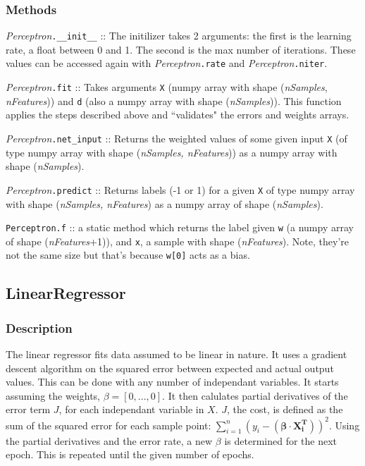\documentclass{article}
\begin{document}
\subsubsection{Methods}

\textit{Perceptron}\texttt{.\_\_init\_\_} :: The initilizer takes 2 arguments:
the first is the learning rate, a float between 0 and 1. The second is the max
number of iterations. These values can be accessed again with
\textit{Perceptron}\texttt{.rate} and \textit{Perceptron}\texttt{.niter}.

\textit{Perceptron}\texttt{.fit} :: Takes arguments \texttt{X} (numpy array with
shape (\textit{nSamples}, \textit{nFeatures})) and \texttt{d} (also a numpy
array with shape (\textit{nSamples})). This function applies the steps described
above and ``validates" the errors and weights arrays.

\textit{Perceptron}\texttt{.net\_input} :: Returns the weighted values of some
given input \texttt{X} (of type numpy array with shape (\textit{nSamples,
nFeatures})) as a numpy array with shape (\textit{nSamples}).

\textit{Perceptron}\texttt{.predict} :: Returns labels (-1 or 1) for a given
\texttt{X} of type numpy array with shape (\textit{nSamples, nFeatures}) as a
numpy array of shape (\textit{nSamples}).

\texttt{Perceptron.f} :: a static method which returns the label given
\texttt{w} (a numpy array of shape (\textit{nFeatures}+1)), and \texttt{x}, a
sample with shape (\textit{nFeatures}). Note, they're not the same size but
that's because \texttt{w[0]} acts as a bias.

\subsection{LinearRegressor}

\subsubsection{Description}

The linear regressor fits data assumed to be linear in nature. It uses a
gradient descent algorithm on the squared error between expected and actual
output values. This can be done with any number of independant variables. It
starts assuming the weights, $\beta = [0, ..., 0]$.  It then calulates partial
derivatives of the error term $J$, for each independant variable in $X$.  $J$,
the cost, is defined as the sum of the squared error for each sample point:
$\sum_{i=1}^{n}(y_i-(\mathbf{\beta}\cdot\mathbf{X^T_i}))^2$.  Using the partial
derivatives and the error rate, a new $\beta$ is determined for the next epoch.
This is repeated until the given number of epochs.
\end{document}
